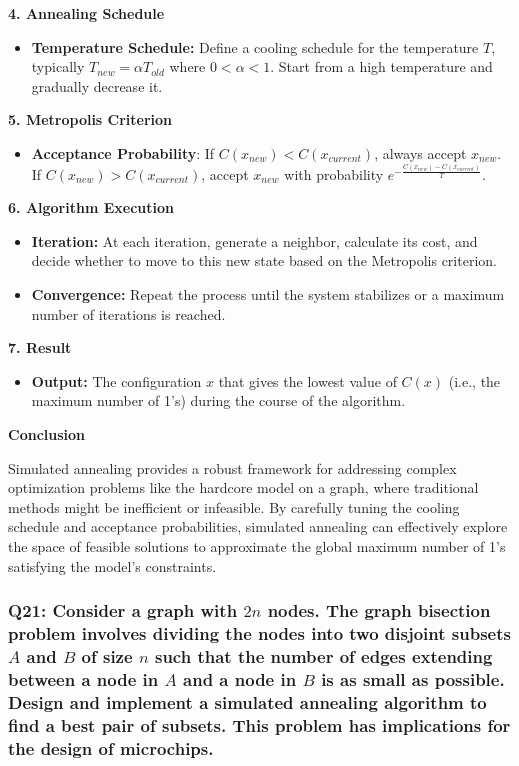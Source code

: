 \documentclass[8pt]{article}
\begin{document}
\textbf{4. Annealing Schedule}
\begin{itemize}
    \item \textbf{Temperature Schedule:} Define a cooling schedule for the temperature \( T \), typically \( T_{new} = \alpha T_{old} \) where \( 0 < \alpha < 1 \). Start from a high temperature and gradually decrease it.
\end{itemize}

\textbf{5. Metropolis Criterion}
\begin{itemize}
    \item \textbf{Acceptance Probability}: If \( C(x_{new}) < C(x_{current}) \), always accept \( x_{new} \). If \( C(x_{new}) > C(x_{current}) \), accept \( x_{new} \) with probability \( e^{-\frac{C(x_{new}) - C(x_{current})}{T}} \).
\end{itemize}

\textbf{6. Algorithm Execution}
\begin{itemize}
    \item \textbf{ Iteration:} At each iteration, generate a neighbor, calculate its cost, and decide whether to move to this new state based on the Metropolis criterion.
    \item \textbf{Convergence:} Repeat the process until the system stabilizes or a maximum number of iterations is reached.
\end{itemize}

\textbf{7. Result}
\begin{itemize}
    \item \textbf{Output:} The configuration \( x \) that gives the lowest value of \( C(x) \) (i.e., the maximum number of 1's) during the course of the algorithm.
\end{itemize}

\textbf{Conclusion}

Simulated annealing provides a robust framework for addressing complex optimization problems like the hardcore model on a graph, where traditional methods might be inefficient or infeasible. By carefully tuning the cooling schedule and acceptance probabilities, simulated annealing can effectively explore the space of feasible solutions to approximate the global maximum number of 1's satisfying the model's constraints.

\subsubsection*{Q21: Consider a graph with \(2n\) nodes. The graph bisection problem involves dividing the nodes into two disjoint subsets \(A\) and \(B\) of size \(n\) such that the number of edges extending between a node in \(A\) and a node in \(B\) is as small as possible. Design and implement a simulated annealing algorithm to find a best pair of subsets. This problem has implications for the design of microchips.}
\end{document}
